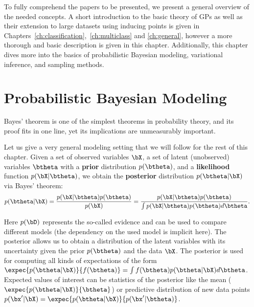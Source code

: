 


\graphicspath{{2_background/figures/}}

To fully comprehend the papers to be presented, we present a general overview of the needed concepts.
A short introduction to the basic theory of \acl{GPs} as well as their extension to large datasets using inducing points \cite{Titsias2009} is given in Chapters~\ref{ch:classification},~\ref{ch:multiclass} and \ref{ch:general}, however a more thorough and basic description is given in this chapter.
Additionally, this chapter dives more into the basics of probabilistic Bayesian modeling, variational inference, and sampling methods.

\section{Probabilistic Bayesian Modeling}

\label{sec:prob_bayes}

Bayes' theorem is one of the simplest theorems in probability theory, and its proof fits in one line, yet its implications are unmeasurably important.

Let us give a very general modeling setting that we will follow for the rest of this chapter.
Given a set of observed variables $\bX$, a set of latent (unobserved) variables $\btheta$ with a \textbf{prior} distribution $p(\btheta)$, and a \textbf{likelihood} function $p(\bX|\btheta)$, we obtain the \textbf{posterior} distribution $p(\btheta|\bX)$ via Bayes' theorem:
\begin{align}
p(\btheta|\bX) = \frac{p(\bX|\btheta)p(\btheta)}{p(\bX)} = \frac{p(\bX|\btheta)p(\btheta)}{\int p(\bX|\btheta)p(\btheta)d\btheta}.
\label{eq:bayes}
\end{align}

Here $p(\bD)$ represents the so-called evidence and can be used to compare different models (the dependency on the used model is implicit here).
The posterior allows us to obtain a distribution of the latent variables with its uncertainty given the prior $p(\btheta)$ and the data $\bX$.
The posterior is used for computing all kinds of expectations of the form $\expec{p(\btheta|\bX)}{f(\btheta)} = \int f(\btheta)p(\btheta|\bX)d\btheta$.
Expected values of interest can be statistics of the posterior like the mean ($\expec{p(\btheta|\bX)}{\btheta}$) or predictive distribution of new data points $p(\bx'|\bX) = \expec{p(\btheta|\bX)}{p(\bx'|\btheta)}$.

